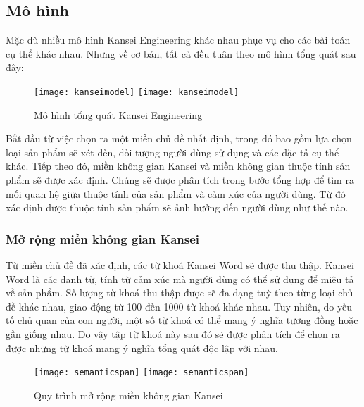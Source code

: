 \subsection{Mô hình}
Mặc dù nhiều mô hình Kansei Engineering khác nhau phục vụ cho các bài toán cụ thể khác nhau. Nhưng về cơ bản, tất cả đều tuân theo mô hình tổng quát sau đây:

\begin{figure}[H]
  \begin{center}
    \ifpdf
      \texttt{[image: kanseimodel]}
    \else
      \texttt{[image: kanseimodel]}
    \fi
    \caption{Mô hình tổng quát Kansei Engineering}
    \label{KanseiModel}
  \end{center}
\end{figure}

Bắt đầu từ việc chọn ra một miền chủ đề nhất định, trong đó bao gồm lựa chọn loại sản phẩm sẽ xét đến, đối tượng người dùng sử dụng và các đặc tả cụ thể khác. Tiếp theo đó, miền không gian Kansei và miền không gian thuộc tính sản phẩm sẽ được xác định. Chúng sẽ được phân tích trong bước tổng hợp để tìm ra mối quan hệ giữa thuộc tính của sản phẩm và cảm xúc của người dùng. Từ đó xác định được thuộc tính sản phẩm sẽ ảnh hưởng đến người dùng như thế nào.

\subsubsection{Mở rộng miền không gian Kansei}

Từ miền chủ đề đã xác định, các từ khoá Kansei Word sẽ được thu thập. Kansei Word là các danh từ, tính từ cảm xúc mà người dùng có thể sử dụng để miêu tả về sản phẩm. Số lượng từ khoá thu thập được sẽ đa dạng tuỳ theo từng loại chủ đề khác nhau, giao động từ 100 đến 1000 từ khoá khác nhau. Tuy nhiên, do yếu tố chủ quan của con người, một số từ khoá có thể mang ý nghĩa tương đồng hoặc gần giống nhau. Do vậy tập từ khoá này sau đó sẽ được phân tích để chọn ra được những từ khoá mang ý nghĩa tổng quát độc lập với nhau.

\begin{figure}[H]
  \begin{center}
    \ifpdf
      \texttt{[image: semanticspan]}
    \else
      \texttt{[image: semanticspan]}
    \fi
    \caption{Quy trình mở rộng miền không gian Kansei}
    \label{SemanticSpanningPhase}
  \end{center}
\end{figure}

